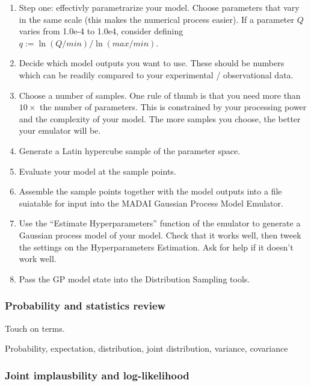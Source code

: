 \documentclass{article}
\begin{document}
\begin{enumerate}

\item Step one: effectivly parametrarize your model. Choose parameters
  that vary in the same scale (this makes the numerical process
  easier). If a parameter $Q$ varies from 1.0e-4 to 1.0e4, consider
  defining $q := \ln(Q/min)/\ln(max/min)$.

\item Decide which model outputs you want to use. These should be
  numbers which can be readily compared to your experimental /
  observational data.

\item Choose a number of samples. One rule of thumb is that you need
  more than $10×$ the number of parameters. This is constrained by
  your processing power and the complexity of your model.  The more
  samples you choose, the better your emulator will be.

\item Generate a Latin hypercube sample of the parameter space. 

\item Evaluate your model at the sample points.

\item Assemble the sample points together with the model outputs into
  a file suiatable for input into the MADAI Gaussian Process Model
  Emulator.

\item Use the “Estimate Hyperparameters” function of the emulator to
  generate a Gaussian process model of your model. Check that it works
  well, then tweek the settings on the Hyperparameters Estimation. Ask
  for help if it doesn’t work well.

\item Pass the GP model state into the Distribution Sampling tools.

\end{enumerate}

\subsubsection{Probability and statistics review}

Touch on terms.

Probability, expectation, distribution, joint distribution, variance,
covariance

\subsubsection{Joint implausbility and log-likelihood}
\end{document}
